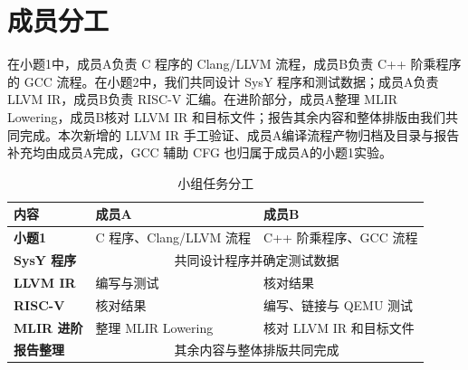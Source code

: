 \section*{成员分工}

在小题1中，成员A负责 C 程序的 Clang/LLVM 流程，成员B负责 C++ 阶乘程序的 GCC 流程。在小题2中，我们共同设计 SysY 程序和测试数据；成员A负责 LLVM IR，成员B负责 RISC-V 汇编。在进阶部分，成员A整理 MLIR Lowering，成员B核对 LLVM IR 和目标文件；报告其余内容和整体排版由我们共同完成。本次新增的 LLVM IR 手工验证、成员A编译流程产物归档及目录与报告补充均由成员A完成，GCC 辅助 CFG 也归属于成员A的小题1实验。

\begin{table}[H]
\centering

\begin{tabularx}{0.95\linewidth}{>{\bfseries}p{3.1cm} X X}
\toprule
内容 & 成员A & 成员B \\
\midrule
小题1
& C 程序、Clang/LLVM 流程
& C++ 阶乘程序、GCC 流程 \\

SysY 程序
& \multicolumn{2}{c}{共同设计程序并确定测试数据} \\

LLVM IR
& 编写与测试
& 核对结果 \\

RISC-V
& 核对结果
& 编写、链接与 QEMU 测试 \\

MLIR 进阶
& 整理 MLIR Lowering
& 核对 LLVM IR 和目标文件 \\

报告整理
& \multicolumn{2}{c}{其余内容与整体排版共同完成} \\
\bottomrule
\end{tabularx}
\caption{小组任务分工}
\label{tab:division}
\end{table}
